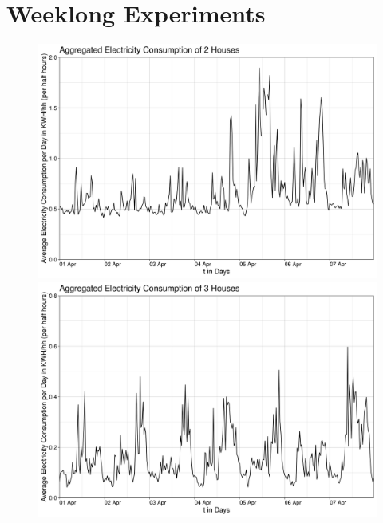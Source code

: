 \chapter{Weeklong Experiments}
\enlargethispage{10}
\vspace*{-10\baseline}
\begin{figure}[!Hhtp]
\centering
\includegraphics[width=0.8\columnwidth]{images/Aggregated Electricity Consumption of 2 Houses6.png}
\caption[Aggregated Electricity Consumption of 2 Houses of the 2nd Experiment of the 2nd Experiment]{}
\label{img:2_Houses_weekly}
\centering
\includegraphics[width=0.8\columnwidth]{images/Aggregated Electricity Consumption of 3 Houses5.png}
\caption[Aggregated Electricity Consumption of 3 Houses of the 2nd Experiment]{}
\label{img:3_Houses_weekly}
\end{figure}

